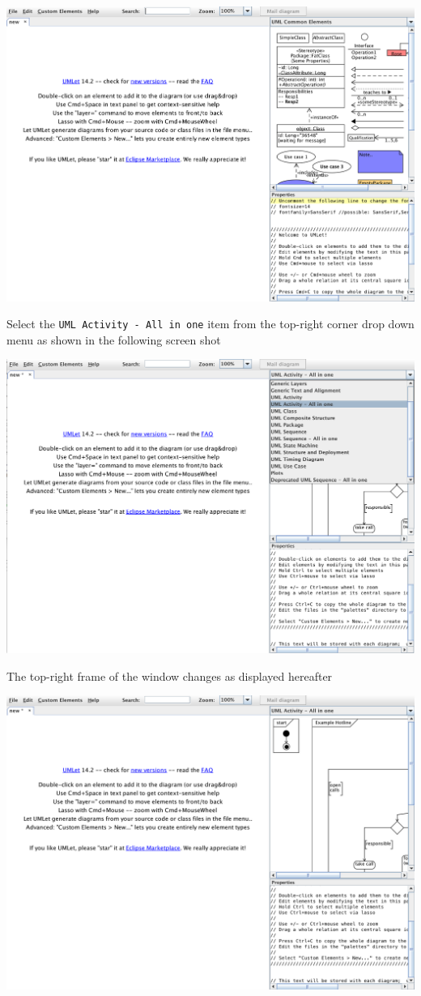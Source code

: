 \documentclass{book}
\begin{document}
\includegraphics[scale=0.35]{fig_gabriele_umlet0.png}

Select the \verb+UML Activity - All in one+ item from the top-right corner drop down menu as shown in the following screen shot 

\includegraphics[scale=0.35]{fig_gabriele_umlet1.png}

The top-right frame of the window changes as displayed hereafter

\includegraphics[scale=0.35]{fig_gabriele_umlet2.png}
\end{document}
